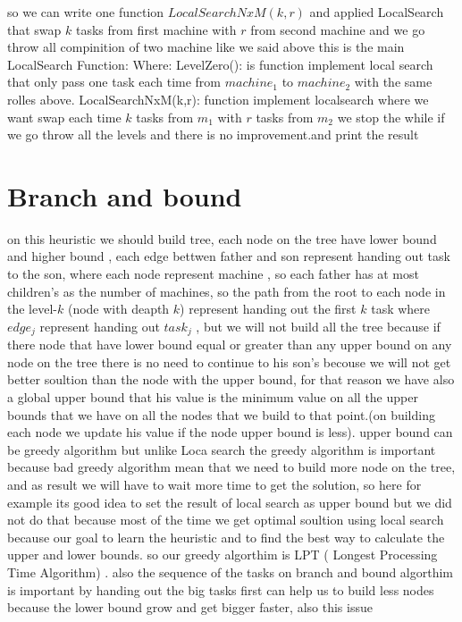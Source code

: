 \documentclass[11pt,fullpage]{article}
\begin{document}
so we can write one function $LocalSearchNxM(k,r)$ and applied LocalSearch that swap $k$ tasks from first machine with $r$ from second machine  and we go throw all compinition of two machine like we said above \newline
this is the main LocalSearch Function:\newline
Where: \newline
LevelZero(): is function implement local search that only pass one task each time from $machine_1$ to $machine_2$ with the same rolles above.\newline
 LocalSearchNxM(k,r): function implement localsearch where we want swap each time $k$ tasks from $m_1$ with $r$ tasks from $m_2$ \newline
we stop the while if we go throw all the levels and there is no improvement.and print the result
 

\section{Branch and bound}
on this heuristic we should build tree, each node on the tree have lower bound and higher bound , each edge bettwen father and son represent handing out task to the son, where each node represent machine , so each father has at most children's as the number of machines, so the path from the root to each node in the level-$k$ (node with deapth $k$) represent handing out the first $k$ task where $edge_j$ represent handing out $task_j$  , but we will not build all the tree because if there node that have lower bound equal or greater than any upper bound on any node on the tree there is no need to continue to his son's becouse we will not get better soultion than the node with the upper bound, for that reason we have also a global upper bound that his value is the minimum value on all  the upper bounds that we have on all the nodes that we build to that point.(on building each node we update his value if the node upper bound is less). upper bound can be greedy algorithm but unlike Loca search the greedy algorithm is important because bad greedy algorithm mean that we need to build more node on the tree, and as result we will have to wait more time to get the solution, so here for example its good idea to set the result of local search as upper bound but we did not do that because  most of the time we get optimal soultion using local search because  our goal to learn the  heuristic and to find the best way to calculate the upper and lower bounds.\newline
so our greedy algorthim is LPT ( Longest Processing Time Algorithm) . also the sequence of the tasks on branch and bound algorthim is important by handing out the big tasks first can help us to build less nodes because  the lower bound grow and get bigger faster, also this issue

 

\end{document}

